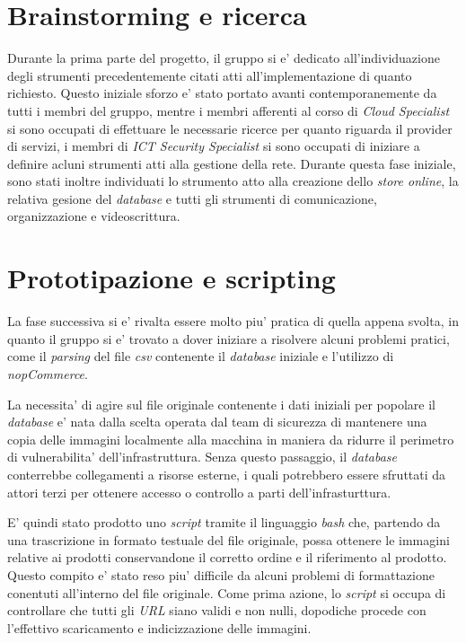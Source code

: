 \documentclass[a4paper]{report}
\begin{document}
	\section{Brainstorming e ricerca}
		Durante la prima parte del progetto, il gruppo si e' dedicato all'individuazione degli strumenti precedentemente
		citati atti all'implementazione di quanto richiesto. Questo iniziale sforzo e' stato portato avanti
		contemporanemente da tutti i membri del gruppo, mentre i membri afferenti al corso di \emph{Cloud Specialist} si
		sono occupati di effettuare le necessarie ricerce per quanto riguarda il provider di servizi, i membri di
		\emph{ICT Security Specialist} si sono occupati di iniziare a definire acluni strumenti atti alla gestione della
		rete.
		Durante questa fase iniziale, sono stati inoltre individuati lo strumento atto alla creazione dello \emph{store
		online}, la relativa gesione del \emph{database} e tutti gli strumenti di comunicazione, organizzazione e
		videoscrittura.
	\section{Prototipazione e scripting}
		La fase successiva si e' rivalta essere molto piu' pratica di quella appena svolta, in quanto il gruppo si e'
		trovato a dover iniziare a risolvere alcuni problemi pratici, come il \emph{parsing} del file \emph{csv}
		contenente il \emph{database} iniziale e l'utilizzo di \emph{nopCommerce}.

		La necessita' di agire sul file originale contenente i dati iniziali per popolare il \emph{database} e' nata
		dalla scelta operata dal team di sicurezza di mantenere una copia delle immagini localmente alla macchina in
		maniera da ridurre il perimetro di vulnerabilita' dell'infrastruttura. Senza questo passaggio, il
		\emph{database} conterrebbe collegamenti a risorse esterne, i quali potrebbero essere sfruttati da attori
		terzi per ottenere accesso o controllo a parti dell'infrasturttura.

		E' quindi stato prodotto uno \emph{script} tramite  il linguaggio \emph{bash} che, partendo da una trascrizione
		in formato testuale del file originale, possa ottenere le immagini relative ai prodotti conservandone il
		corretto ordine e il riferimento al prodotto. Questo compito e' stato reso piu' difficile da alcuni problemi di
		formattazione conentuti all'interno del file originale. Come prima azione, lo \emph{script} si occupa di
		controllare che tutti gli \emph{URL} siano validi e non nulli, dopodiche procede con l'effettivo scaricamento e
		indicizzazione delle immagini.
\end{document}
